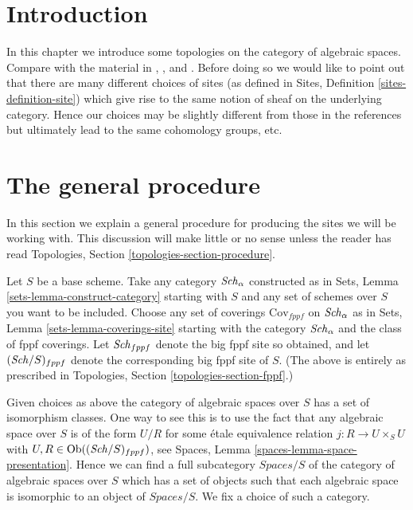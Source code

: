\section{Introduction}
\label{spaces-topologies-section-introduction}
In this chapter we introduce some topologies on the
category of algebraic spaces. Compare with the material in \cite{SGA1},
\cite{Ner}, \cite{LM-B} and \cite{Kn}.
Before doing so we would like to point out that there
are many different choices of sites (as defined in
Sites, Definition \ref{sites-definition-site}) which give rise to
the same notion of sheaf on the underlying category. Hence
our choices may be slightly different from those in the references
but ultimately lead to the same cohomology groups, etc.

\section{The general procedure}
\label{spaces-topologies-section-procedure}
In this section we explain a general procedure for producing the
sites we will be working with. This discussion will make little or
no sense unless the reader has read
Topologies, Section \ref{topologies-section-procedure}.

\medskip\noindent
Let $S$ be a base scheme.
Take any category $\mathit{Sch}_\alpha$ constructed as in
Sets, Lemma \ref{sets-lemma-construct-category} starting with
$S$ and any set of schemes over $S$ you want to be included.
Choose any set of
coverings $\text{Cov}_{fppf}$ on $\mathit{Sch}_\alpha$ as in
Sets, Lemma \ref{sets-lemma-coverings-site}
starting with the category $\mathit{Sch}_\alpha$ and the class of fppf
coverings. Let $\mathit{Sch}_{fppf}$ denote the big fppf site so
obtained, and let $(\mathit{Sch}/S)_{fppf}$ denote the corresponding
big fppf site of $S$. (The above is entirely as prescribed in Topologies,
Section \ref{topologies-section-fppf}.)

\medskip\noindent
Given choices as above the category of algebraic spaces over $S$
has a set of isomorphism classes. One way to see this is to use the
fact that any algebraic space over $S$ is of the form $U/R$ for
some \'etale equivalence relation $j : R \to U \times_S U$ with
$U, R \in \operatorname{Ob}((\mathit{Sch}/S)_{fppf})$, see
Spaces, Lemma \ref{spaces-lemma-space-presentation}.
Hence we can find a full subcategory $\textit{Spaces}/S$ of the category of
algebraic spaces over $S$ which has a set of objects
such that each algebraic space is isomorphic to an object of
$\textit{Spaces}/S$. We fix a choice of such a category.

